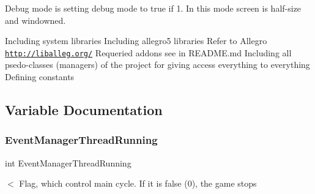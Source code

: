 Debug mode is setting debug mode to true if 1. In this mode screen is half-\/size and windowned. 

Including system libraries Including allegro5 libraries Refer to Allegro \href{http://liballeg.org/}{\tt http\+://liballeg.\+org/} Requeried addons see in R\+E\+A\+D\+M\+E.\+md Including all psedo-\/classes (managers) of the project for giving access everything to everything Defining constants 

\subsection{Variable Documentation}
\mbox{\label{group___library_merger_ga1318fa5effb70983960c09c162701742}} 
\subsubsection{\texorpdfstring{Event\+Manager\+Thread\+Running}{EventManagerThreadRunning}}
{\footnotesize\ttfamily int Event\+Manager\+Thread\+Running}

$<$ Flag, which control main cycle. If it is false (0), the game stops 